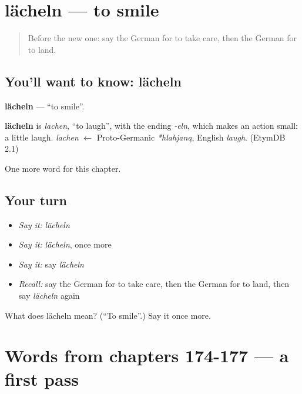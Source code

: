 \section[lächeln]{lächeln — to smile}

\label{lesson:GE-C182-laecheln}



\begin{quote}
Before the new one: say the German for to take care, then the German for to land.
\end{quote}

\subsection*{You'll want to know: lächeln}
\textbf{lächeln} — \textquotedblleft{}to smile\textquotedblright{}.

\begin{cousinweb}
\textbf{lächeln} is \emph{lachen}, \textquotedblleft{}to laugh\textquotedblright{}, with the ending \emph{-eln}, which makes an action small: a little laugh. \emph{lachen} $\leftarrow$ Proto-Germanic \emph{*hlahjaną}, English \emph{laugh}. (EtymDB 2.1)
\end{cousinweb}

\begin{grammarlens}[title={What you've built}]
One more word for this chapter.
\end{grammarlens}

\subsection*{Your turn}
\begin{itemize}
\raggedright
  \item \emph{Say it:} \emph{lächeln}
  \item \emph{Say it:} \emph{lächeln}, once more
  \item \emph{Say it:} say \emph{lächeln}
  \item \emph{Recall:} say the German for to take care, then the German for to land, then say \emph{lächeln} again
\end{itemize}

\begin{tcolorbox}[breakable,colback=teal!4,colframe=teal!35!black,title={Before you move on}]
What does lächeln mean? (\textquotedblleft{}To smile\textquotedblright{}.) Say it once more.
\end{tcolorbox}
\section[(dialogue)]{Words from chapters 174-177 — a first pass}

